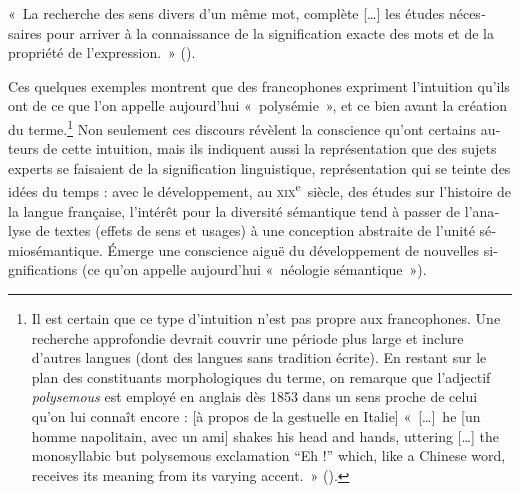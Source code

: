 \documentclass[french,output=paper,colorlinks,citecolor=brown]{../langscibook}
\begin{document}
\begin{otherlanguage}{french}
\ea «~La recherche des sens divers d’un même mot, complète […] les études nécessaires pour arriver à la connaissance de la signification exacte des mots et de la propriété de l’expression.~» (\citealt[252]{Michel1858}).
\z

Ces quelques exemples montrent que des francophones expriment l’intuition qu’ils ont de ce que l’on appelle aujourd’hui «~polysémie~», et ce bien avant la création du terme.\footnote{Il est certain que ce type d’intuition n’est pas propre aux francophones. Une recherche approfondie devrait couvrir une période plus large et inclure d’autres langues (dont des langues sans tradition écrite). En restant sur le plan des constituants morphologiques du terme, on remarque que l’adjectif \textit{polysemous} est employé en anglais dès 1853 dans un sens proche de celui qu’on lui connaît encore : [à propos de la gestuelle en Italie] «~[…]~he [un homme napolitain, avec un ami] shakes his head and hands, uttering […] the monosyllabic but polysemous exclamation ``Eh !'' which, like a Chinese word, receives its meaning from its varying accent.~» (\citealt[534]{Wiseman1853}).} Non seulement ces discours révèlent la conscience qu’ont certains auteurs de cette intuition, mais ils indiquent aussi la représentation que des sujets experts se faisaient de la signification linguistique, représentation qui se teinte des idées du temps : avec le développement, au \textsc{xix}\textsuperscript{e}~siècle, des études sur l’histoire de la langue française, l’intérêt pour la diversité sémantique tend à passer de l’analyse de textes (effets de sens et usages) à une conception abstraite de l’unité sémiosémantique. Émerge une conscience aiguë du développement de nouvelles significations (ce qu’on appelle aujourd’hui «~néologie sémantique~»).


\end{otherlanguage}
\end{document}
